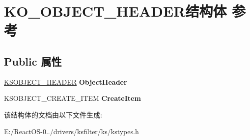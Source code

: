 \hypertarget{struct_k_o___o_b_j_e_c_t___h_e_a_d_e_r}{}\section{K\+O\+\_\+\+O\+B\+J\+E\+C\+T\+\_\+\+H\+E\+A\+D\+E\+R结构体 参考}
\label{struct_k_o___o_b_j_e_c_t___h_e_a_d_e_r}
\subsection*{Public 属性}
\begin{DoxyCompactItemize}
\item 
\mbox{\label{struct_k_o___o_b_j_e_c_t___h_e_a_d_e_r_a1238ebeb27c6e30762df35e8b25ad107}} 
\hyperlink{interfacevoid}{K\+S\+O\+B\+J\+E\+C\+T\+\_\+\+H\+E\+A\+D\+ER} {\bfseries Object\+Header}
\item 
\mbox{\label{struct_k_o___o_b_j_e_c_t___h_e_a_d_e_r_aff7d5584ef87451f118103027c51f59a}} 
K\+S\+O\+B\+J\+E\+C\+T\+\_\+\+C\+R\+E\+A\+T\+E\+\_\+\+I\+T\+EM {\bfseries Create\+Item}
\end{DoxyCompactItemize}


该结构体的文档由以下文件生成\+:\begin{DoxyCompactItemize}
\item 
E\+:/\+React\+O\+S-\/0../drivers/ksfilter/ks/kstypes.\+h\end{DoxyCompactItemize}
